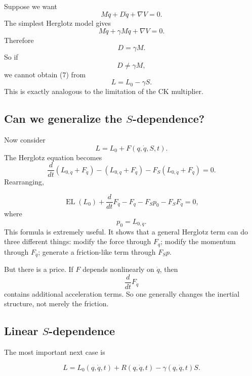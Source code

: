 Suppose we want
\begin{equation}
 \boxed{ M\ddot q+D\dot q+\nabla V=0. } \tag{7} 
\end{equation}
The simplest Herglotz model gives
$$ M\ddot q+\gamma M\dot q+\nabla V=0. $$
Therefore $$ D=\gamma M. $$
So if $$ D\neq\gamma M, $$ we cannot obtain (7) from
$$ L=L_0-\gamma S. $$
This is exactly analogous to the limitation of the CK multiplier.

\subsection{Can we generalize the \(S\)-dependence?}

Now consider 
\begin{equation}
 \boxed{ L=L_0+F(q,\dot q,S,t). } \tag{8} 
\end{equation}
The Herglotz equation becomes
$$ \frac{d}{dt} \left( L_{0,\dot q}+F_{\dot q} \right) - \left( L_{0,q}+F_q \right) - F_S \left( L_{0,\dot q}+F_{\dot q} \right) =0. $$
Rearranging,
 
\begin{equation}
\boxed{ \operatorname{EL}(L_0) + \frac{d}{dt}F_{\dot q} -F_q -F_Sp_0 -F_SF_{\dot q} =0, } \tag{9} 
\end{equation}
where
$$ p_0=L_{0,\dot q}. $$
This formula is extremely useful.
It shows that a general Herglotz term can do three different things:
modify the force through \(F_q\);
modify the momentum through \(F_{\dot q}\);
generate a friction-like term through \(F_Sp\).

But there is a price.
If \(F\) depends nonlinearly on \(\dot q\), then
$$ \frac{d}{dt}F_{\dot q} $$
contains additional acceleration terms.
So one generally changes the inertial structure, not merely the friction.

\subsection{Linear \(S\)-dependence}
The most important next case is

\begin{equation}
\boxed{ L=L_0(q,\dot q,t)+R(q,\dot q,t)-\gamma(q,\dot q,t)S.}\tag{10}
\end{equation}

